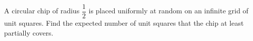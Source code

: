 A circular chip of radius $\dfrac{1}{2}$ is placed uniformly at random on an infinite grid of unit squares. Find the expected number of unit squares that the chip at least partially covers.
